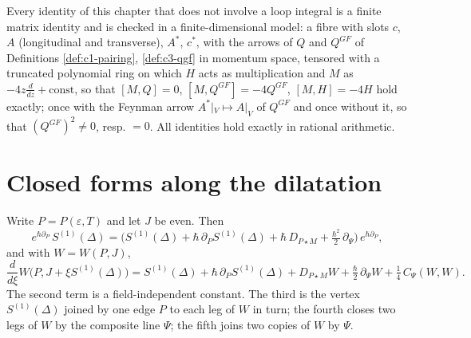\begin{remark}[Verification]
Every identity of this chapter that does not involve a loop integral is a finite matrix identity and is checked in a finite-dimensional model: a fibre with slots $c$, $A$ (longitudinal and transverse), $A^*$, $c^*$, with the arrows of $Q$ and $Q^{GF}$ of Definitions \ref{def:c1-pairing}, \ref{def:c3-qgf} in momentum space, tensored with a truncated polynomial ring on which $H$ acts as multiplication and $M$ as $-4z\frac{d}{dz}+\text{const}$, so that $[M,Q]=0$, $[M,Q^{GF}]=-4Q^{GF}$, $[M,H]=-4H$ hold exactly; once with the Feynman arrow $A^*|_V\mapsto A|_V$ of $Q^{GF}$ and once without it, so that $(Q^{GF})^2\neq0$, resp. $=0$. All identities hold exactly in rational arithmetic.
\end{remark}

\section{Closed forms along the dilatation}

\begin{proposition}
\label{prop:d-D1a}
Write $P=P(\varepsilon,T)$ and let $J$ be even. Then
\begin{equation}
e^{\hbar\partial_P}\,S^{(1)}(\Delta)=\Big(S^{(1)}(\Delta)+\hbar\,\partial_PS^{(1)}(\Delta)+\hbar\,D_{P\star M}+\tfrac{\hbar^2}2\,\partial_\Psi\Big)\,e^{\hbar\partial_P},
\label{eq:d-conj}
\end{equation}
and with $W=W(P,J)$,
\begin{equation}
\frac{d}{d\xi}W\big(P,J+\xi S^{(1)}(\Delta)\big)=S^{(1)}(\Delta)+\hbar\,\partial_PS^{(1)}(\Delta)+D_{P\star M}W+\tfrac\hbar2\,\partial_\Psi W+\tfrac14\,C_\Psi(W,W).
\label{eq:d-D1a}
\end{equation}
The second term is a field-independent constant. The third is the vertex $S^{(1)}(\Delta)$ joined by one edge $P$ to each leg of $W$ in turn; the fourth closes two legs of $W$ by the composite line $\Psi$; the fifth joins two copies of $W$ by $\Psi$.
\end{proposition}

